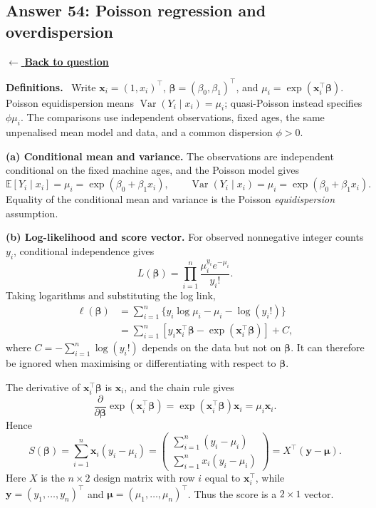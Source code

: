 \documentclass[11pt,a4paper]{article}
\newcommand{\given}{\mathrel{|}}
\newcommand{\E}{\mathbb{E}}
\newcommand{\answernav}[1]{%
  \label{answer:#1}%
  \noindent\hyperref[question:#1]{$\leftarrow$ \textbf{Back to question}}%
  \par\smallskip}
\newcommand{\studyheading}[1]{%
  \par\medskip\noindent\textcolor{statblue}{\textbf{#1.}}\ }
\begin{document}
\clearpage

\subsection{Answer 54: Poisson regression and overdispersion}
\answernav{54}

\studyheading{Definitions}
Write $\mathbf x_i=(1,x_i)^\top$, $\boldsymbol\beta=(\beta_0,\beta_1)^\top$, and $\mu_i=\exp(\mathbf x_i^\top\boldsymbol\beta)$.
Poisson equidispersion means $\operatorname{Var}(Y_i\given x_i)=\mu_i$; quasi-Poisson instead specifies $\phi\mu_i$.
The comparisons use independent observations, fixed ages, the same unpenalised mean model and data, and a common dispersion $\phi>0$.

\textbf{(a) Conditional mean and variance.}
The observations are independent conditional on the fixed machine ages,
and the Poisson model gives
\[
\boxed{
\E[Y_i\given x_i]=\mu_i=\exp(\beta_0+\beta_1x_i),\qquad
\operatorname{Var}(Y_i\given x_i)=\mu_i=\exp(\beta_0+\beta_1x_i).
}
\]
Equality of the conditional mean and variance is the Poisson
\emph{equidispersion} assumption.

\textbf{(b) Log-likelihood and score vector.}
For observed nonnegative integer counts $y_i$, conditional independence
gives
\[
L(\boldsymbol\beta)
=\prod_{i=1}^n\frac{\mu_i^{y_i}e^{-\mu_i}}{y_i!}.
\]
Taking logarithms and substituting the log link,
\[
\begin{aligned}
\ell(\boldsymbol\beta)
&=\sum_{i=1}^n\{y_i\log\mu_i-\mu_i-\log(y_i!)\}\\
&=\sum_{i=1}^n\left[
y_i\mathbf x_i^\top\boldsymbol\beta
-\exp(\mathbf x_i^\top\boldsymbol\beta)\right]+C,
\end{aligned}
\]
where $C=-\sum_{i=1}^n\log(y_i!)$ depends on the data but not on
$\boldsymbol\beta$. It can therefore be ignored when maximising or
differentiating with respect to $\boldsymbol\beta$.

The derivative of $\mathbf x_i^\top\boldsymbol\beta$ is $\mathbf x_i$,
and the chain rule gives
\[
\frac{\partial}{\partial\boldsymbol\beta}
\exp(\mathbf x_i^\top\boldsymbol\beta)
=\exp(\mathbf x_i^\top\boldsymbol\beta)\mathbf x_i
=\mu_i\mathbf x_i.
\]
Hence
\[
\boxed{
S(\boldsymbol\beta)
=\sum_{i=1}^n\mathbf x_i(y_i-\mu_i)
=\begin{pmatrix}
\sum_{i=1}^n(y_i-\mu_i)\\[3pt]
\sum_{i=1}^n x_i(y_i-\mu_i)
\end{pmatrix}
=X^\top(\mathbf y-\boldsymbol\mu).
}
\]
Here $X$ is the $n\times2$ design matrix with row $i$ equal to
$\mathbf x_i^\top$, while $\mathbf y=(y_1,\ldots,y_n)^\top$ and
$\boldsymbol\mu=(\mu_1,\ldots,\mu_n)^\top$. Thus the score is a
$2\times1$ vector.
\end{document}
